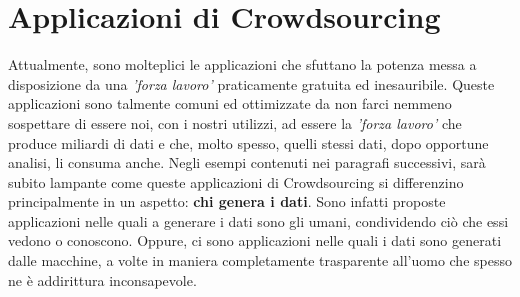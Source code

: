 \section{Applicazioni di Crowdsourcing}
\label{sec:crowdsourcing_application}
Attualmente, sono molteplici le applicazioni che sfuttano la potenza messa a disposizione da una \textit{'forza lavoro'} praticamente gratuita ed inesauribile. Queste applicazioni sono talmente comuni ed ottimizzate da non farci nemmeno sospettare di essere noi, con i nostri utilizzi, ad essere la \textit{'forza lavoro'} che produce miliardi di dati e che, molto spesso, quelli stessi dati, dopo opportune analisi, li consuma anche.
Negli esempi contenuti nei paragrafi successivi, sarà subito lampante come queste applicazioni di Crowdsourcing si differenzino principalmente in un aspetto: \textbf{chi genera i dati}. Sono infatti proposte applicazioni nelle quali a generare i dati sono gli umani, condividendo ciò che essi vedono o conoscono. Oppure, ci sono applicazioni nelle quali i dati sono generati dalle macchine, a volte in maniera completamente trasparente all'uomo che spesso ne è addirittura inconsapevole.
